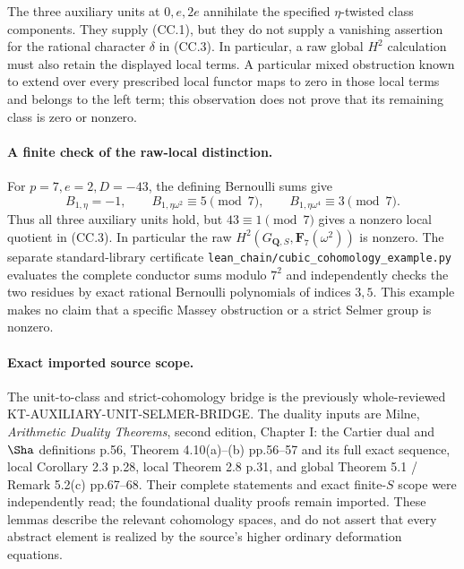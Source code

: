 The three auxiliary units at $0,e,2e$ annihilate the specified
$\eta$-twisted class components.  They supply (CC.1), but they
do not supply a vanishing assertion for the rational character
$\delta$ in (CC.3).  In particular, a raw global $H^2$ calculation
must also retain the displayed local terms.  A particular mixed
obstruction known to extend over every prescribed local functor
maps to zero in those local terms and belongs to the left term;
this observation does not prove that its remaining class is
zero or nonzero.

\paragraph{A finite check of the raw-local distinction.}
For $p=7,e=2,D=-43$, the defining Bernoulli sums give
\[
 B_{1,\eta}=-1,\qquad
 B_{1,\eta\omega^2}\equiv5\pmod7,\qquad
 B_{1,\eta\omega^4}\equiv3\pmod7.                    \tag{CC.4}
\]
Thus all three auxiliary units hold, but $43\equiv1\pmod7$
gives a nonzero local quotient in (CC.3).  In particular the
raw $H^2(G_{\mathbf Q,S},\mathbf F_7(\omega^2))$ is nonzero.
The separate standard-library certificate
\texttt{lean\_chain/cubic\_cohomology\_example.py} evaluates the
complete conductor sums modulo $7^2$ and independently checks
the two residues by exact rational Bernoulli polynomials of
indices $3,5$.  This example makes no claim that a specific
Massey obstruction or a strict Selmer group is nonzero.

\paragraph{Exact imported source scope.}
The unit-to-class and strict-cohomology bridge is the previously
whole-reviewed KT-AUXILIARY-UNIT-SELMER-BRIDGE.  The duality
inputs are Milne, \emph{Arithmetic Duality Theorems}, second
edition, Chapter I: the Cartier dual and $\Sha$ definitions
p.56, Theorem 4.10(a)--(b) pp.56--57 and its full exact sequence,
local Corollary 2.3 p.28, local Theorem 2.8 p.31, and global
Theorem 5.1 / Remark 5.2(c) pp.67--68.  Their complete statements
and exact finite-$S$ scope were independently read; the
foundational duality proofs remain imported.  These lemmas
describe the relevant cohomology spaces, and do not assert
that every abstract element is realized by the source's
higher ordinary deformation equations.
